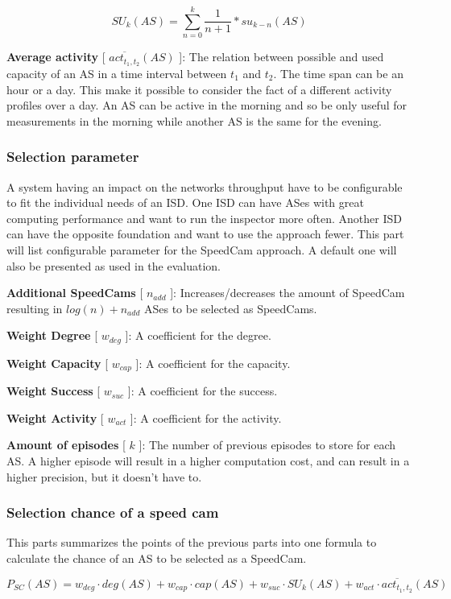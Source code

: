 \documentclass[thesis.tex]{subfiles}
\begin{document}
$$SU_{k}(AS) = \sum_{n=0}^{k} \frac{1}{n+1}*su_{k-n}(AS)$$

\newpage
\textbf{Average activity} [ $\overline{act_{t_1,t_2}}(AS)$ ]: The relation between possible and used capacity of an AS in a time interval between $t_1$ and $t_2$. The time span can be an hour or a day. This make it possible to consider the fact of a different activity profiles over a day. An AS can be active in the morning and so be only useful for measurements in the morning while another AS is the same for the evening. 


\subsubsection{Selection parameter}

A system having an impact on the networks throughput have to be configurable to fit the individual needs of an ISD. One ISD can have ASes with great computing performance and want to run the inspector more often. Another ISD can have the opposite foundation and want to use the approach fewer. This part will list configurable parameter for the SpeedCam approach. A default one will also be presented as used in the evaluation.

\textbf{Additional SpeedCams} [ $n_{add}$ ]: Increases/decreases the amount of SpeedCam resulting in $log(n) + n_{add}$ ASes to be selected as SpeedCams.

\textbf{Weight Degree} [ $w_{deg}$ ]: A coefficient for the degree. 

\textbf{Weight Capacity} [ $w_{cap}$ ]: A coefficient for the capacity. 

\textbf{Weight Success} [ $w_{suc}$ ]: A coefficient for the success. 

\textbf{Weight Activity} [ $w_{act}$ ]: A coefficient for the activity. 

\textbf{Amount of episodes} [ $k$ ]: The number of previous episodes to store for each AS. A higher episode will result in a higher computation cost, and can result in a higher precision, but it doesn't have to.

\subsubsection{Selection chance of a speed cam}
This parts summarizes the points of the previous parts into one formula to calculate the chance of an AS to be selected as a SpeedCam.

$$P_{SC}(AS) = w_{deg}\cdot deg(AS) + w_{cap}\cdot cap(AS) + w_{suc}\cdot SU_k(AS) + w_{act}\cdot \overline{act_{t_1,t_2}}(AS)$$
\end{document}
